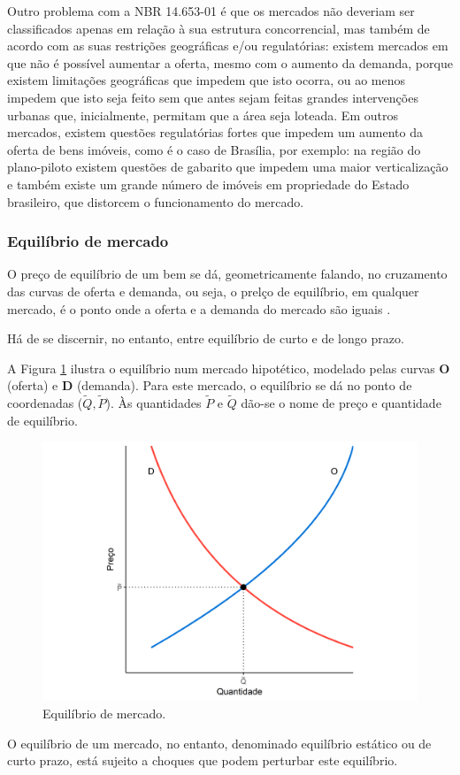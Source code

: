 \documentclass[
	12pt,				%
	oneside,			%
	a4paper,			%
	chapter=TITLE,		%
	section=TITLE,		%
	english,			%
	brazil				%
	]{abntex2}
\begin{document}
Outro problema com a NBR 14.653-01 é que os mercados não deveriam ser
classificados apenas em relação à sua estrutura concorrencial, mas também de
acordo com as suas restrições geográficas e/ou regulatórias: existem mercados em
que não é possível aumentar a oferta, mesmo com o aumento da demanda, porque
existem limitações geográficas que impedem que isto ocorra, ou ao menos impedem
que isto seja feito sem que antes sejam feitas grandes intervenções urbanas que,
inicialmente, permitam que a área seja loteada. Em outros mercados, existem
questões regulatórias fortes que impedem um aumento da oferta de bens imóveis,
como é o caso de Brasília, por exemplo: na região do plano-piloto existem
questões de gabarito que impedem uma maior verticalização e também existe um
grande número de imóveis em propriedade do Estado brasileiro, que distorcem o
funcionamento do mercado.

\hypertarget{equiluxedbrio-de-mercado}{%
\subsubsection{Equilíbrio de mercado}\label{equiluxedbrio-de-mercado}}

O preço de equilíbrio de um bem se dá, geometricamente falando, no cruzamento
das curvas de oferta e demanda, ou seja, o prelço de equilíbrio, em qualquer
mercado, é o ponto onde a oferta e a demanda do mercado são iguais \autocite[p.~310]{varian}.

Há de se discernir, no entanto, entre equilíbrio de curto e de longo prazo.

A Figura \ref{fig:equilibrioMercado} ilustra o equilíbrio num mercado
hipotético, modelado pelas curvas \textbf{O} (oferta) e \textbf{D} (demanda). Para este
mercado, o equilíbrio se dá no ponto de coordenadas (\(\tilde Q, \tilde P\)). Às
quantidades \(\tilde P\) e \(\tilde Q\) dão-se o nome de preço e quantidade de
equilíbrio.
\begin{figure}[H]

{\centering \includegraphics[width=0.7\linewidth]{images/equilibrioMercado-1} 

}

\caption{Equilíbrio de mercado.}\label{fig:equilibrioMercado}
\end{figure}
O equilíbrio de um mercado, no entanto, denominado equilíbrio estático ou de
curto prazo, está sujeito a choques que podem perturbar este equilíbrio.
\end{document}
